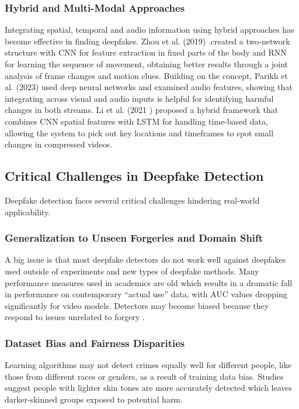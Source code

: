 \documentclass[conference]{IEEEtran}
\begin{document}
\subsubsection{Hybrid and Multi-Modal Approaches}
Integrating spatial, temporal and audio information using hybrid approaches has become effective in finding deepfakes. Zhou et al. (2019) \cite{zhou2017two}.created a two-network structure with CNN for feature extraction in fixed parts of the body and RNN for learning the sequence of movement, obtaining better results through a joint analysis of frame changes and motion clues. Building on the concept, Parikh et al. (2023) \cite{parikh2023audio} used deep neural networks and examined audio features, showing that integrating across visual and audio inputs is helpful for identifying harmful changes in both streams. Li et al. (2021 \cite{huang2024spatiotemporal}) proposed a hybrid framework that combines CNN spatial features with LSTM for handling time-based data, allowing the system to pick out key locations and timeframes to spot small changes in compressed videos.





\subsection{Critical Challenges in Deepfake Detection}
Deepfake detection faces several critical challenges hindering real-world applicability.

\subsubsection{Generalization to Unseen Forgeries and Domain Shift}
A big issue is that most deepfake detectors do not work well against deepfakes used outside of experiments and new types of deepfake methods. Many performance measures used in academics are old which results in a dramatic fall in performance on contemporary “actual use” data, with AUC values dropping significantly for video models. Detectors may become biased because they respond to issues unrelated to forgery \cite{fu2025unbiased}.

\subsubsection{Dataset Bias and Fairness Disparities}
Learning algorithms may not detect crimes equally well for different people, like those from different races or genders, as a result of training data bias. Studies suggest \cite{mubarak2023survey} people with lighter skin tones are more accurately detected which leaves darker-skinned groups exposed to potential harm.
\end{document}
